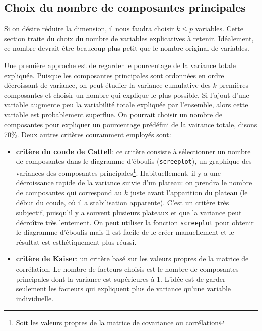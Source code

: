 \documentclass[
  11pt,
  letterpaper,
]{book}
\providecommand{\tightlist}{%
  \setlength{\itemsep}{0pt}\setlength{\parskip}{0pt}}\usepackage{longtable,booktabs,array}
\theoremstyle{definition}
\theoremstyle{remark}
\begin{document}
\hypertarget{sec-acp-choix}{%
\subsection{Choix du nombre de composantes
principales}\label{sec-acp-choix}}

Si on désire réduire la dimension, il nous faudra choisir \(k \leq p\)
variables. Cette section traite du choix du nombre de variables
explicatives à retenir. Idéalement, ce nombre devrait être beaucoup plus
petit que le nombre original de variables.

Une première approche est de regarder le pourcentage de la variance
totale expliquée. Puisque les composantes principales sont ordonnées en
ordre décroissant de variance, on peut étudier la variance cumulative
des \(k\) premières composantes et choisir un nombre qui explique le
plus possible. Si l'ajout d'une variable augmente peu la variabilité
totale expliquée par l'ensemble, alors cette variable est probablement
superflue. On pourrait choisir un nombre de composantes pour expliquer
un pourcentage prédéfini de la vairance totale, disons 70\%. Deux autres
critères couramment employés sont:

\begin{itemize}
\tightlist
\item
  \textbf{critère du coude de Cattell}: ce critère consiste à
  sélectionner un nombre de composantes dans le diagramme d'éboulis
  (\texttt{screeplot}), un graphique des variances des composantes
  principales\footnote{Soit les valeurs propres de la matrice de
    covariance ou corrélation}. Habituellement, il y a une décroissance
  rapide de la variance suivie d'un plateau: on prendra le nombre de
  composantes qui correspond au \(k\) juste avant l'apparition du
  plateau (le début du coude, où il a stabilisation apparente). C'est un
  critère très subjectif, puisqu'il y a souvent plusieurs plateaux et
  que la variance peut décroître très lentement. On peut utiliser la
  fonction \texttt{screeplot} pour obtenir le diagramme d'éboulis mais
  il est facile de le créer manuellement et le résultat est
  esthétiquement plus réussi.
\item
  \textbf{critère de Kaiser}: un critère basé sur les valeurs propres de
  la matrice de corrélation. Le nombre de facteurs choisis est le nombre
  de composantes principales dont la variance est supérieures à 1.
  L'idée est de garder seulement les facteurs qui expliquent plus de
  variance qu'une variable individuelle.
\end{itemize}
\end{document}
